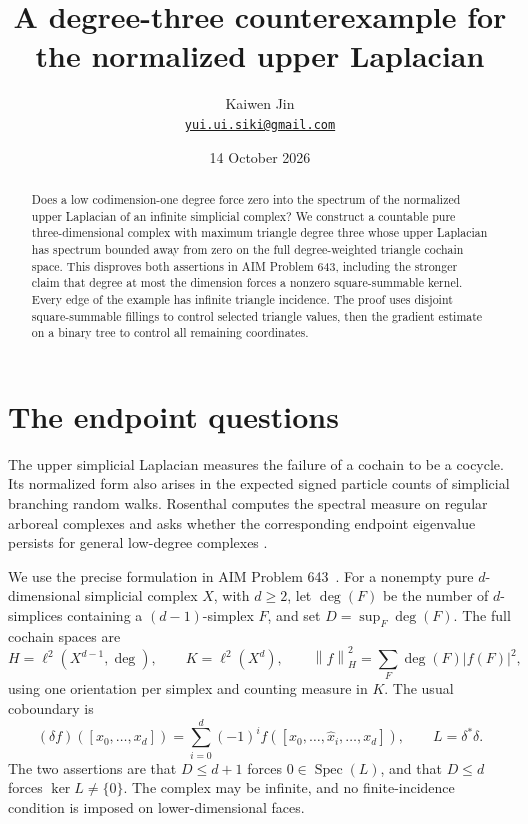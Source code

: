 \documentclass[11pt]{article}
\newcommand{\Spec}{\operatorname{Spec}}
\newcommand{\degf}{\operatorname{deg}}
\newcommand{\norm}[1]{\left\lVert#1\right\rVert}
\begin{document}
\title{A degree-three counterexample for the normalized upper Laplacian}
\author{Kaiwen Jin\\\small\href{mailto:yui.ui.siki@gmail.com}{\texttt{yui.ui.siki@gmail.com}}}
\date{14 October 2026}
\maketitle

\begin{abstract}
Does a low codimension-one degree force zero into the spectrum of the
normalized upper Laplacian of an infinite simplicial complex? We construct a
countable pure three-dimensional complex with maximum triangle degree three
whose upper Laplacian has spectrum bounded away from zero on the full
degree-weighted triangle cochain space. This disproves both assertions in
AIM Problem 643, including the stronger claim that degree at most the
dimension forces a nonzero square-summable kernel. Every edge of the example
has infinite triangle incidence. The proof uses disjoint square-summable
fillings to control selected triangle values, then the gradient estimate on
a binary tree to control all remaining coordinates.
\end{abstract}

\section{The endpoint questions}\label{sec:introduction}

The upper simplicial Laplacian measures the failure of a cochain to be a
cocycle. Its normalized form also arises in the expected signed particle
counts of simplicial branching random walks. Rosenthal computes the spectral
measure on regular arboreal complexes and asks whether the corresponding
endpoint eigenvalue persists for general low-degree complexes
\cite[Theorem 1.1 and Conjecture 4.3]{Rosenthal}.

We use the precise formulation in AIM Problem 643~\cite{AIM643}.
For a nonempty pure $d$-dimensional simplicial complex $X$, with $d\geq2$,
let $\degf(F)$ be the number of $d$-simplices containing a $(d-1)$-simplex
$F$, and set $D=\sup_F\degf(F)$. The full cochain spaces are
\[
 H=\ell^2(X^{d-1},\degf),\qquad K=\ell^2(X^d),\qquad
 \norm{f}_H^2=\sum_F\degf(F)|f(F)|^2,
\]
using one orientation per simplex and counting measure in $K$. The usual
coboundary is
\[
 (\delta f)([x_0,\ldots,x_d])
   =\sum_{i=0}^d(-1)^if([x_0,\ldots,\widehat x_i,\ldots,x_d]),
 \qquad L=\delta^*\delta.
\]
The two assertions are that $D\leq d+1$ forces $0\in\Spec(L)$, and that
$D\leq d$ forces $\ker L\ne\{0\}$. The complex may be infinite, and no
finite-incidence condition is imposed on lower-dimensional faces.
\end{document}
